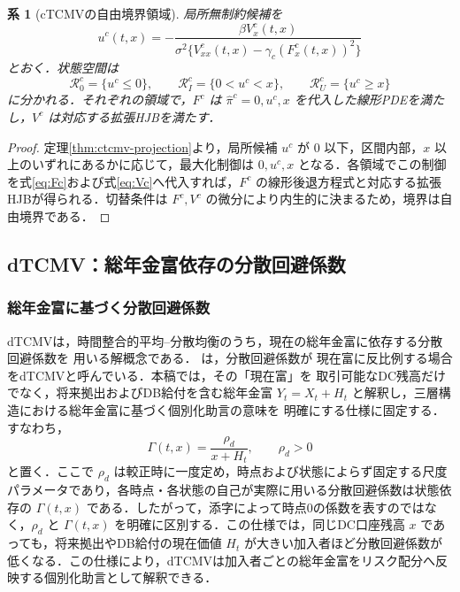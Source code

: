\documentclass[10pt,a4paper]{article}
\theoremstyle{plain}
\newtheorem{corollary}{系}
\theoremstyle{definition}
\begin{document}
\begin{corollary}[cTCMVの自由境界領域]
局所無制約候補を
\[
  u^c(t,x)=
  -\frac{\beta V_x^c(t,x)}{\sigma^2\{V_{xx}^c(t,x)-\gamma_c(F_x^c(t,x))^2\}}
\]
とおく．状態空間は
\[
  \mathcal R_0^c=\{u^c\leq0\},\qquad
  \mathcal R_I^c=\{0<u^c<x\},\qquad
  \mathcal R_U^c=\{u^c\geq x\}
\]
に分かれる．それぞれの領域で，$F^c$ は $\hat\pi^c=0,u^c,x$ を代入した線形PDEを満たし，$V^c$ は対応する拡張HJBを満たす．
\end{corollary}

\begin{proof}
定理\ref{thm:ctcmv-projection}より，局所候補 $u^c$ が $0$ 以下，区間内部，$x$ 以上のいずれにあるかに応じて，最大化制御は $0,u^c,x$ となる．各領域でこの制御を式\eqref{eq:Fc}および式\eqref{eq:Vc}へ代入すれば，$F^c$ の線形後退方程式と対応する拡張HJBが得られる．切替条件は $F^c,V^c$ の微分により内生的に決まるため，境界は自由境界である．
\end{proof}

\subsection{dTCMV：総年金富依存の分散回避係数}
\label{sec:dtcmv}


\subsubsection{総年金富に基づく分散回避係数}

dTCMVは，時間整合的平均--分散均衡のうち，現在の総年金富に依存する分散回避係数を
用いる解概念である．\citet{vanStadenDangForsyth2021} は，分散回避係数が
現在富に反比例する場合をdTCMVと呼んでいる．本稿では，その「現在富」を
取引可能なDC残高だけでなく，将来拠出およびDB給付を含む総年金富
$Y_t=X_t+H_t$ と解釈し，三層構造における総年金富に基づく個別化助言の意味を
明確にする仕様に固定する．すなわち，
\begin{equation}
  \Gamma(t,x)=\frac{\rho_d}{x+H_t},
  \qquad \rho_d>0
  \label{eq:Gamma-total}
\end{equation}
と置く．ここで $\rho_d$ は較正時に一度定め，時点および状態によらず固定する尺度パラメータであり，各時点・各状態の自己が実際に用いる分散回避係数は状態依存の $\Gamma(t,x)$ である．したがって，添字によって時点0の係数を表すのではなく，$\rho_d$ と $\Gamma(t,x)$ を明確に区別する．この仕様では，同じDC口座残高 $x$ であっても，将来拠出やDB給付の現在価値 $H_t$ が大きい加入者ほど分散回避係数が低くなる．この仕様により，dTCMVは加入者ごとの総年金富をリスク配分へ反映する個別化助言として解釈できる．
\end{document}

